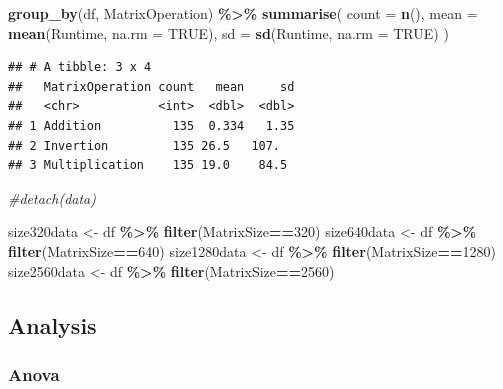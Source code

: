 \documentclass[
]{article}
\newenvironment{Shaded}{\begin{snugshade}}{\end{snugshade}}
\newcommand{\CommentTok}[1]{\textcolor[rgb]{0.56,0.35,0.01}{\textit{#1}}}
\newcommand{\DataTypeTok}[1]{\textcolor[rgb]{0.13,0.29,0.53}{#1}}
\newcommand{\DecValTok}[1]{\textcolor[rgb]{0.00,0.00,0.81}{#1}}
\newcommand{\KeywordTok}[1]{\textcolor[rgb]{0.13,0.29,0.53}{\textbf{#1}}}
\newcommand{\NormalTok}[1]{#1}
\newcommand{\OperatorTok}[1]{\textcolor[rgb]{0.81,0.36,0.00}{\textbf{#1}}}
\newcommand{\OtherTok}[1]{\textcolor[rgb]{0.56,0.35,0.01}{#1}}
\newcommand{\StringTok}[1]{\textcolor[rgb]{0.31,0.60,0.02}{#1}}
\begin{document}
\begin{Shaded}
\begin{Highlighting}[]
\KeywordTok{group\_by}\NormalTok{(df, MatrixOperation) }\OperatorTok{\%\textgreater{}\%}
\StringTok{  }\KeywordTok{summarise}\NormalTok{(}
    \DataTypeTok{count =} \KeywordTok{n}\NormalTok{(),}
    \DataTypeTok{mean =} \KeywordTok{mean}\NormalTok{(Runtime, }\DataTypeTok{na.rm =} \OtherTok{TRUE}\NormalTok{),}
    \DataTypeTok{sd =} \KeywordTok{sd}\NormalTok{(Runtime, }\DataTypeTok{na.rm =} \OtherTok{TRUE}\NormalTok{)}
\NormalTok{  )}
\end{Highlighting}
\end{Shaded}

\begin{verbatim}
## # A tibble: 3 x 4
##   MatrixOperation count   mean     sd
##   <chr>           <int>  <dbl>  <dbl>
## 1 Addition          135  0.334   1.35
## 2 Invertion         135 26.5   107.  
## 3 Multiplication    135 19.0    84.5
\end{verbatim}

\begin{Shaded}
\begin{Highlighting}[]
\CommentTok{\#detach(data) }

\NormalTok{size320data \textless{}{-}}\StringTok{ }\NormalTok{df }\OperatorTok{\%\textgreater{}\%}\StringTok{ }\KeywordTok{filter}\NormalTok{(MatrixSize}\OperatorTok{==}\DecValTok{320}\NormalTok{)}
\NormalTok{size640data \textless{}{-}}\StringTok{ }\NormalTok{df }\OperatorTok{\%\textgreater{}\%}\StringTok{ }\KeywordTok{filter}\NormalTok{(MatrixSize}\OperatorTok{==}\DecValTok{640}\NormalTok{)}
\NormalTok{size1280data \textless{}{-}}\StringTok{ }\NormalTok{df }\OperatorTok{\%\textgreater{}\%}\StringTok{ }\KeywordTok{filter}\NormalTok{(MatrixSize}\OperatorTok{==}\DecValTok{1280}\NormalTok{)}
\NormalTok{size2560data \textless{}{-}}\StringTok{ }\NormalTok{df }\OperatorTok{\%\textgreater{}\%}\StringTok{ }\KeywordTok{filter}\NormalTok{(MatrixSize}\OperatorTok{==}\DecValTok{2560}\NormalTok{)}
\end{Highlighting}
\end{Shaded}

\hypertarget{analysis}{%
\subsection{Analysis}\label{analysis}}

\hypertarget{anova}{%
\subsubsection{Anova}\label{anova}}
\end{document}
